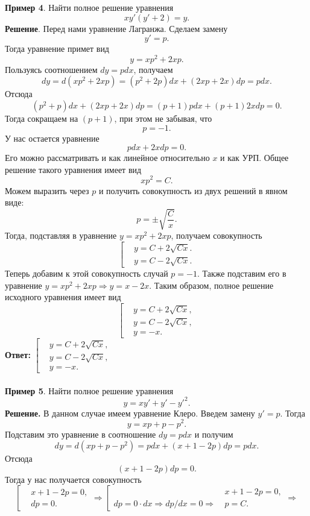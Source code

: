 \documentclass[a4paper, 12pt]{article}
\begin{document}
\textbf{Пример 4}. Найти полное решение уравнения $$xy'(y' + 2) = y.$$
\textbf{Решение}. Перед нами уравнение Лагранжа. Сделаем замену $$y' = p.$$ Тогда уравнение примет вид $$y = xp^2 + 2xp.$$
Пользуясь соотношением $dy = pdx$, получаем $$dy = d(xp^2 + 2xp) = (p^2 + 2p)dx + (2xp + 2x)dp = pdx.$$
Отсюда $$(p^2 + p)dx + (2xp + 2x)dp = (p+1)pdx + (p+1)2xdp = 0.$$
Тогда сокращаем на $(p + 1)$, при этом не забывая, что $$p = - 1.$$
У нас остается уравнение $$pdx + 2xdp = 0.$$ Его можно рассматривать и как линейное относительно $x$ и как УРП. Общее решение такого уравнения имеет вид $$xp^2 = C.$$
Можем выразить через $p$ и получить совокупность из двух решений в явном виде: $$p = \pm \sqrt{\dfrac{C}{x}}.$$
Тогда, подставляя в уравнение $y = xp^2 + 2xp$, получаем совокупность $$\left[\begin{aligned}
	&y = C + 2\sqrt{Cx}.\\
	&y =  C - 2\sqrt{Cx}.
\end{aligned}\right.$$
Теперь добавим к этой совокупность случай $p = - 1.$ Также подставим его в уравнение $y = xp^2 + 2xp \Rightarrow y = x - 2x$. Таким образом, полное решение исходного уравнения имеет вид $$\left[\begin{aligned}
	&y = C + 2\sqrt{Cx},\\
	&y =  C - 2\sqrt{Cx},\\
	&y = -x.
\end{aligned}\right.$$
\textbf{Ответ:} $\left[\begin{aligned}
	&y = C + 2\sqrt{Cx},\\
	&y =  C - 2\sqrt{Cx},\\
	&y = -x.
\end{aligned}\right.$\\\\
\textbf{Пример 5}. Найти полное решение уравнения $$y = xy' + y' - y'^2.$$
\textbf{Решение.} В данном случае имеем уравнение Клеро. Введем замену $y' = p$. Тогда $$y = xp + p -p^2.$$ Подставим это уравнение в соотношение $dy = pdx$ и получим $$dy = d(xp + p - p^2) = pdx + (x +1 - 2p)dp = pdx.$$
Отсюда $$(x + 1 - 2p)dp = 0.$$
Тогда у нас получается совокупность $$\left[\begin{aligned}
	&x + 1 - 2p = 0,\\
	&dp = 0.
\end{aligned}\right.\Rightarrow \left[\begin{aligned}
&x + 1 - 2p = 0,\\
dp = 0\cdot dx \Rightarrow dp/dx = 0\Rightarrow\ &p = C.
\end{aligned}\right. \Rightarrow$$
\end{document}
